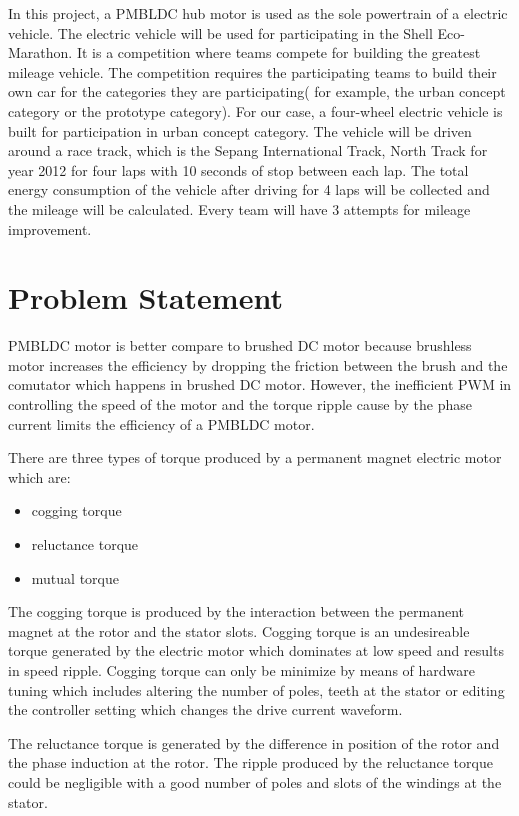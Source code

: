 In this project, a PMBLDC hub motor is used as the sole powertrain of a electric vehicle. The electric vehicle will be used for participating in the Shell Eco-Marathon. It is a competition where teams compete for building the greatest mileage vehicle. The competition requires the participating teams to build their own car for the categories they are participating( for example, the urban concept category or the prototype category). For our case, a four-wheel electric vehicle is built for participation in urban concept category. The vehicle will be driven around a race track, which is the Sepang International Track, North Track for year 2012 for four laps with 10 seconds of stop between each lap. The total energy consumption of the vehicle after driving for 4 laps will be collected and the mileage will be calculated. Every team will have 3 attempts for mileage improvement.

\section{Problem Statement}
PMBLDC motor is better compare to brushed DC motor because brushless motor increases the efficiency by dropping the friction between the brush and the comutator which happens in brushed DC motor. However, the inefficient PWM in controlling the speed of the motor and the torque ripple cause by the phase current limits the efficiency of a PMBLDC motor.

There are three types of torque produced by a permanent magnet electric motor which are:

\begin{itemize}
	\item cogging torque
	\item reluctance torque
	\item mutual torque
\end{itemize}

The cogging torque is produced by the interaction between the permanent magnet at the rotor and the stator slots. Cogging torque is an undesireable torque generated by the electric motor which dominates at low speed and results in speed ripple. Cogging torque can only be minimize by means of hardware tuning which includes altering the number of poles, teeth at the stator or editing the controller setting which changes the drive current waveform.

The reluctance torque is generated by the difference in position of the rotor and the phase induction at the rotor. The ripple produced by the reluctance torque could be negligible with a good number of poles and slots of the windings at the stator.

